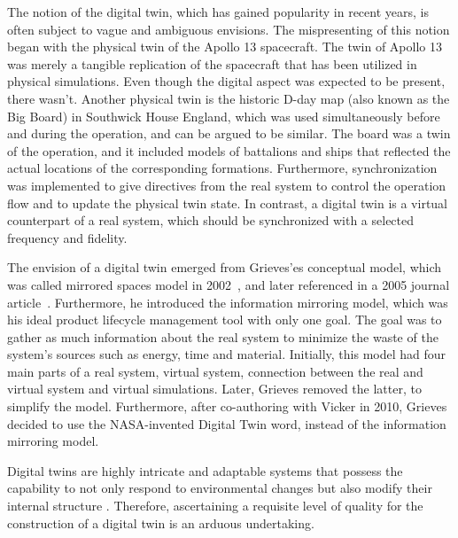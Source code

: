 \documentclass{llncs}
\begin{document}
    The notion of the digital twin, which has gained popularity in 
    recent years, is often subject to vague and ambiguous envisions\cite{Review1}.
    The mispresenting of this notion began with the physical twin of the Apollo 13 spacecraft. 
    The twin of Apollo 13 was merely a tangible replication of the spacecraft that has been utilized in physical simulations. 
    Even though the digital aspect was expected to be present, there wasn't\cite{GrievesApollo13}.
    Another physical twin is the historic D-day map (also known as the Big Board) in Southwick House England, 
    which was used simultaneously before and during the operation, and can be argued to be similar. 
    The board was a twin of the operation, and it included models of battalions and ships that reflected the actual 
    locations of the corresponding formations. Furthermore, synchronization was 
    implemented to give directives from the real system to control the operation 
    flow and to update the physical twin state\cite{AMRC}.
    In contrast, a digital twin is a virtual counterpart of a real system, which should 
    be synchronized with a selected frequency and fidelity\cite{Review1,Review2,digitaltwinconsortium2022}.
    
    The envision of a digital twin emerged from Grieves'es conceptual model, which was called mirrored spaces model in 2002~\cite{Originsofdigitaltwinconcept},
    and later referenced in a 2005 journal article~\cite{2005JournayArticle}. 
    Furthermore, he introduced the information mirroring model, which was his ideal product lifecycle management tool with only one goal. 
    The goal was to gather as much information about the real system to minimize the waste of the system's sources such as energy, 
    time and material. Initially, this model had four main parts of a real system, 
    virtual system, connection between the real and virtual system and virtual simulations\cite{GrievesPLMBook}. 
    Later, Grieves removed the latter, to simplify the model\cite{Originsofdigitaltwinconcept}. Furthermore, after co-authoring with Vicker in 2010, 
    Grieves decided to use the NASA-invented Digital Twin word, instead of the information mirroring model\cite{Originsofdigitaltwinconcept}.
        
    Digital twins are highly intricate and adaptable systems that possess the capability to not only respond to environmental 
    changes but also modify their internal structure \cite{ZHANGUPDATEMETHOD, MobusSystemTheory}. Therefore, ascertaining a 
    requisite level of quality for the construction of a digital twin is an arduous undertaking.
\end{document}
